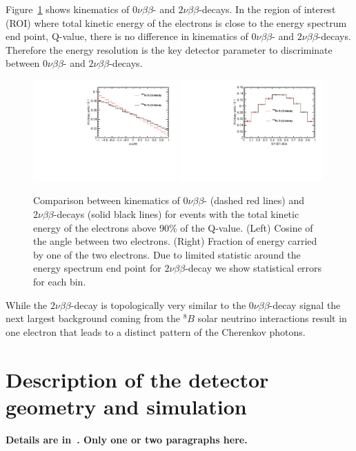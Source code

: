 \documentclass[12pt,twoside,letterpaper]{article}
\newcommand{\vbb}{0\nu\beta\beta}
\newcommand{\vvbb}{2\nu\beta\beta}
\newcommand{\B}{^{8}B}
\begin{document}
Figure~\ref{fig:Kinematics} shows kinematics of $\vbb$- and $\vvbb$-decays.  In the region of interest (ROI) where total kinetic energy of the electrons is close to the energy spectrum end point, Q-value, there is no difference in kinematics of $\vbb$- and $\vvbb$-decays. Therefore the energy resolution is the key detector parameter to discriminate between $\vbb$- and $\vvbb$-decays.

\begin{figure}[htb]
\centering
\includegraphics[angle=0,width=0.49\textwidth]{plots/hCos_Te130.pdf}
\includegraphics[angle=0,width=0.49\textwidth]{plots/hE1toQ_Te130.pdf}
\caption{Comparison between kinematics of $\vbb$- (dashed red lines) and $\vvbb$-decays (solid black lines) for events with the total kinetic energy of the electrons above 90\% of the Q-value. (Left) Cosine of the angle between two electrons. (Right) Fraction of energy carried by one of the two electrons. Due to limited statistic around the energy spectrum end point for $\vvbb$-decay we show statistical errors for each bin.}
\label{fig:Kinematics}
\end{figure}


While the $\vvbb$-decay is topologically very similar to the $\vbb$-decay signal the next largest background coming from the $\B$ solar neutrino interactions result in one electron that leads to a distinct pattern of the Cherenkov photons.

\section{Description of the detector geometry and simulation}
{\bf Details are in~\cite{Directionality}. Only one or two paragraphs here.}
\end{document}
